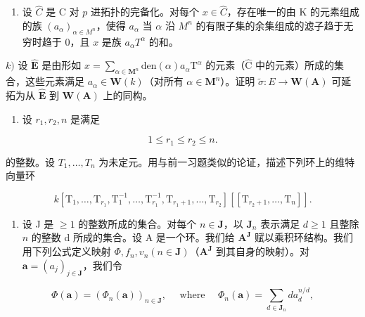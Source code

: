 \begin{enumerate}
\def\labelenumi{\alph{enumi})}
\setcounter{enumi}{9}
\tightlist
\item
  设 \(\hat{C}\) 是 C 对 \(p\) 进拓扑的完备化。对每个 \(x \in \hat{C}\)，存在唯一的由 K 的元素组成的族 \((a_{\alpha})_{\alpha \in M^{n}}\)，使得 \(a_{\alpha}\) 当 \(\alpha\) 沿 \(M^{n}\) 的有限子集的余集组成的滤子趋于无穷时趋于 0，且 \(x\) 是族 \(a_{\alpha}T^{\alpha}\) 的和。
\end{enumerate}

\(k)\) 设 \(\hat{\mathbf{E}}\) 是由形如 \(x = \sum_{\alpha \in \mathbf{M}^n}\mathrm{den}(\alpha)a_\alpha \mathrm{T}^\alpha\) 的元素（\(\hat{\mathrm{C}}\) 中的元素）所成的集合，这些元素满足 \(a_{\alpha}\in \mathbf{W}(k)\)（对所有 \(\alpha\in\mathbf{M}^{n}\)）。证明 \(\tilde{\sigma}:E\to\mathbf{W}(\mathbf{A})\) 可延拓为从 \(\hat{\mathbf{E}}\) 到 \(\mathbf{W}(\mathbf{A})\) 上的同构。

\begin{enumerate}
\def\labelenumi{\arabic{enumi})}
\setcounter{enumi}{26}
\tightlist
\item
  设 \(r_{1}, r_{2}, n\) 是满足
\end{enumerate}

\[
1 \leqslant r _ {1} \leqslant r _ {2} \leqslant n.
\]

的整数。设 \(T_{1}, \ldots, T_{n}\) 为未定元。用与前一习题类似的论证，描述下列环上的维特向量环

\[
k \left[ \mathrm{T} _ {1}, \dots , \mathrm{T} _ {r _ {1}}, \mathrm{T} _ {1} ^ {- 1}, \dots , \mathrm{T} _ {r _ {1}} ^ {- 1}, \mathrm{T} _ {r _ {1} + 1}, \dots , \mathrm{T} _ {r _ {2}} \right] \left[ \left[ \mathrm{T} _ {r _ {2} + 1}, \dots , \mathrm{T} _ {n} \right] \right].
\]

\begin{enumerate}
\def\labelenumi{\arabic{enumi})}
\setcounter{enumi}{27}
\tightlist
\item
  设 J 是 \(\geqslant 1\) 的整数所成的集合。对每个 \(n \in \mathbf{J}\)，以 \(\mathbf{J}_n\) 表示满足 \(d \geqslant 1\) 且整除 \(n\) 的整数 d 所成的集合。设 A 是一个环。我们给 \(\mathbf{A}^{\mathbf{J}}\) 赋以乘积环结构。我们用下列公式定义映射 \(\Phi, f_n, v_n (n \in \mathbf{J})\)（\(\mathbf{A}^{\mathbf{J}}\) 到其自身的映射）。对 \(\boldsymbol{a} = (a_j)_{j \in \mathbf{J}}\)，我们令
\end{enumerate}

\[
\Phi (\boldsymbol {a}) = \left(\Phi_ {n} (\boldsymbol {a})\right) _ {n \in \mathbf {J}}, \quad \text { where } \quad \Phi_ {n} (\boldsymbol {a}) = \sum_ {d \in \mathbf {J} _ {n}} d a _ {d} ^ {n / d},
\]

